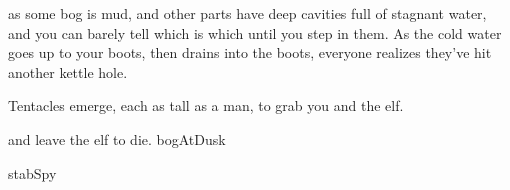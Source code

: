 as some bog is mud, and other parts have deep cavities full of stagnant water, and you can barely tell which is which until you step in them.
As the cold water goes up to your boots, then drains into the boots, everyone realizes they've hit another kettle hole.

Tentacles emerge, each as tall as a man, to grab you and the elf.

\begin{selectPath}
  {and leave the elf to die.}%
  {bogAtDusk}

  {}%
  {stabSpy}
\end{selectPath}
